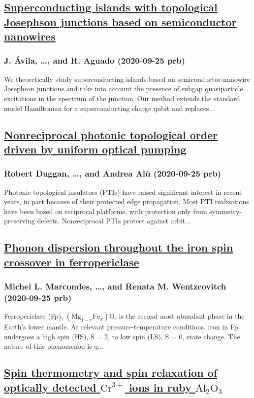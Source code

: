 \subsection*{\href{http://link.aps.org/doi/10.1103/PhysRevB.102.094518}{Superconducting islands with topological Josephson junctions based on semiconductor nanowires}}
\subsubsection*{J. Ávila, \dots, and R. Aguado (2020-09-25 prb)}
We theoretically study superconducting islands based on semiconductor-nanowire Josephson junctions and take into account the presence of subgap quasiparticle excitations in the spectrum of the junction. Our method extends the standard model Hamiltonian for a superconducting charge qubit and replaces...
\subsection*{\href{http://link.aps.org/doi/10.1103/PhysRevB.102.100303}{Nonreciprocal photonic topological order driven by uniform optical pumping}}
\subsubsection*{Robert Duggan, \dots, and Andrea Alù (2020-09-25 prb)}
Photonic topological insulators (PTIs) have raised significant interest in recent years, in part because of their protected edge propagation. Most PTI realizations have been based on reciprocal platforms, with protection only from symmetry-preserving defects. Nonreciprocal PTIs protect against arbit...
\subsection*{\href{http://link.aps.org/doi/10.1103/PhysRevB.102.104112}{Phonon dispersion throughout the iron spin crossover in ferropericlase}}
\subsubsection*{Michel L. Marcondes, \dots, and Renata M. Wentzcovitch (2020-09-25 prb)}
Ferropericlase (Fp), $({\mathrm{Mg}}_{1−x}{\mathrm{Fe}}_{x})\mathrm{O}$, is the second most abundant phase in the Earth's lower mantle. At relevant pressure-temperature conditions, iron in Fp undergoes a high spin (HS), S = 2, to low spin (LS), S = 0, state change. The nature of this phenomenon is q...
\subsection*{\href{http://link.aps.org/doi/10.1103/PhysRevB.102.104114}{Spin thermometry and spin relaxation of optically detected ${\mathrm{Cr}}^{3+}$ ions in ruby ${\mathrm{Al}}_{2}{\mathrm{O}}_{3}$}}
